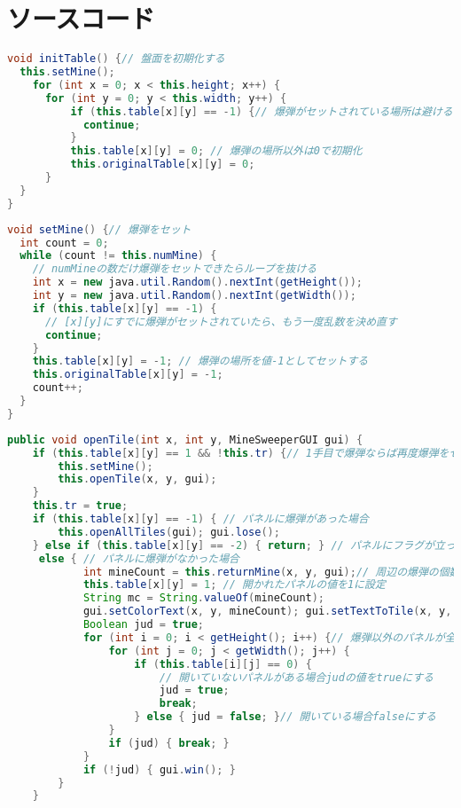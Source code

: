 \documentclass[a4j,11pt]{jsarticle}
\begin{document}
\section*{ソースコード}
\lstset{frame=shadowbox,numbers=left}
\begin{lstlisting}[caption=\ttfamily initTable, label=src:initTable, language=Java]
void initTable() {// 盤面を初期化する
  this.setMine();
    for (int x = 0; x < this.height; x++) {
      for (int y = 0; y < this.width; y++) {
          if (this.table[x][y] == -1) {// 爆弾がセットされている場所は避ける
            continue;
          }
          this.table[x][y] = 0; // 爆弾の場所以外は0で初期化
          this.originalTable[x][y] = 0;
      }
  }
}
\end{lstlisting}
\begin{lstlisting}[caption=\ttfamily setMine, label=src:setMine, language=Java]
void setMine() {// 爆弾をセット
  int count = 0;
  while (count != this.numMine) {
    // numMineの数だけ爆弾をセットできたらループを抜ける
    int x = new java.util.Random().nextInt(getHeight());
    int y = new java.util.Random().nextInt(getWidth());
    if (this.table[x][y] == -1) {
      // [x][y]にすでに爆弾がセットされていたら、もう一度乱数を決め直す
      continue;
    }
    this.table[x][y] = -1; // 爆弾の場所を値-1としてセットする
    this.originalTable[x][y] = -1;
    count++;
  }
}
\end{lstlisting}
\begin{lstlisting}[caption=\ttfamily openTile, label=src:openTile, language=Java]
public void openTile(int x, int y, MineSweeperGUI gui) {
    if (this.table[x][y] == 1 && !this.tr) {// 1手目で爆弾ならば再度爆弾をセット
        this.setMine();
        this.openTile(x, y, gui);
    }
    this.tr = true;
    if (this.table[x][y] == -1) { // パネルに爆弾があった場合
        this.openAllTiles(gui); gui.lose();
	} else if (this.table[x][y] == -2) { return; } // パネルにフラグが立っている場合
     else { // パネルに爆弾がなかった場合
			int mineCount = this.returnMine(x, y, gui);// 周辺の爆弾の個数を調査
			this.table[x][y] = 1; // 開かれたパネルの値を1に設定
			String mc = String.valueOf(mineCount);
			gui.setColorText(x, y, mineCount); gui.setTextToTile(x, y, mc); 
            Boolean jud = true;
			for (int i = 0; i < getHeight(); i++) {// 爆弾以外のパネルが全て開いているか確認
				for (int j = 0; j < getWidth(); j++) {
					if (this.table[i][j] == 0) {
						// 開いていないパネルがある場合judの値をtrueにする
						jud = true;
						break;
					} else { jud = false; }// 開いている場合falseにする
				}
				if (jud) { break; }
			}
			if (!jud) { gui.win(); }
		}
	}
\end{lstlisting}
\end{document}
